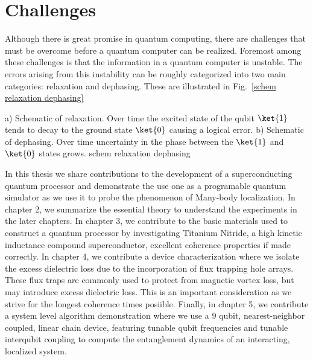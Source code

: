 \section{Challenges}
Although there is great promise in quantum computing, there are challenges that must be overcome before a quantum computer can be realized.
Foremost among these challenges is that the information in a quantum computer is unstable.
The errors arising from this instability can be roughly categorized into two main categories: relaxation and dephasing.  These are illustrated in Fig.~\ref{schem relaxation dephasing}

{
a) Schematic of relaxation.  Over time the excited state of the qubit $\ket{1}$ tends to decay to the ground state $\ket{0}$ causing a logical error.
b) Schematic of dephasing.  Over time uncertainty in the phase between the $\ket{1}$ and $\ket{0}$ states grows.
}
{schem relaxation dephasing}


In this thesis we share contributions to the development of a superconducting quantum processor
and demonstrate the use one as a programable quantum simulator as we use it to probe the phenomenon of Many-body localization.
In chapter 2, we summarize the essential theory to understand the experiments in the later chapters.
In chapter 3, we contribute to the basic materials used to construct a quantum processor by investigating Titanium Nitride,
a high kinetic inductance compound superconductor, excellent coherence properties if made correctly.
In chapter 4, we contribute a device characterization where we isolate the excess dielectric loss due to the incorporation of flux trapping hole arrays.
These flux traps are commonly used to protect from magnetic vortex loss, but may introduce excess dielectric loss.
This is an important consideration as we strive for the longest coherence times posiible.
Finally, in chapter 5, we contribute a system level algorithm demonstration where we use a $9$ qubit, nearest-neighbor coupled,
linear chain device, featuring tunable qubit frequencies and tunable interqubit coupling to compute the entanglement dynamics of an interacting, localized system.
